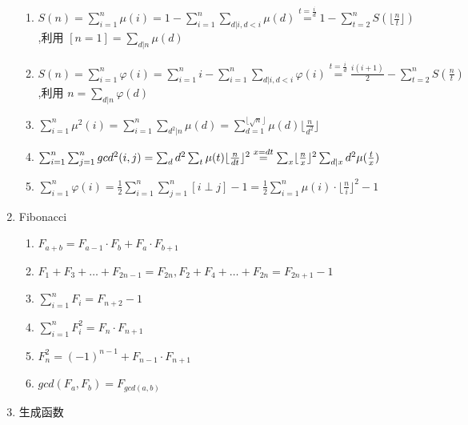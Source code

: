 \documentclass[twoside]{article}
\begin{document}
\begin{enumerate}
\begin{enumerate}
	\item $S(n)=\sum_{i=1}^n \mu(i)=1-\sum_{i=1}^n \sum_{d|i,d < i}\mu(d) \overset{t=\frac id}{=} 1-\sum_{t=2}^nS(\lfloor \frac nt \rfloor)$,利用 $[n=1] = \sum_{d|n} \mu(d)$
	
	\item $S(n)=\sum_{i=1}^n \varphi(i)=\sum_{i=1}^n i-\sum_{i=1}^n \sum_{d|i,d<i} \varphi(i)\overset{t=\frac id}{=} \frac {i(i+1)}{2} - \sum_{t=2}^n S(\frac n t)$,利用 $n = \sum_{d|n} \varphi(d)$
	
	\item $\sum_{i=1}^n \mu^2(i) = \sum_{i=1}^n \sum_{d^2|n} \mu(d)=\sum_{d=1}^{\lfloor \sqrt n \rfloor}\mu(d) \lfloor \frac n {d^2} \rfloor$ 
	
	\item $\sum_{i=1}^n \sum_{j=1}^n gcd^2(i, j)= \sum_{d} d^2 \sum_{t} \mu(t) \lfloor \frac n{dt} \rfloor ^2 \\
	  \overset{x=dt}{=} \sum_{x} \lfloor \frac nx \rfloor ^ 2 \sum_{d|x} d^2 \mu(\frac tx)$
	
	\item $\sum_{i=1}^n \varphi(i)=\frac 12 \sum_{i=1}^n \sum_{j=1}^n [i \perp j] - 1=\frac 12 \sum_{i=1}^n \mu(i) \cdot\lfloor \frac n i \rfloor ^2-1$

\end{enumerate}

\item Fibonacci

\begin{enumerate}
	
	\item $F_{a+b}=F_{a-1} \cdot F_b+F_a \cdot F_{b+1}$
	
	\item $F_1+F_3+\dots +F_{2n-1} = F_{2n},F_2 + F_4 + \dots + F_{2n} = F_{2n + 1} - 1$
	
	\item $\sum_{i=1}^n F_i = F_{n+2} - 1$
	
	\item $\sum_{i=1}^n F_i^2 = F_n \cdot F_{n+1}$
	
	\item $F_n^2=(-1)^{n-1} + F_{n-1} \cdot F_{n+1}$
	
	\item $gcd(F_a, F_b)=F_{gcd(a, b)}$

\end{enumerate}

\item 生成函数

\begin{enumerate}


\end{enumerate}
\end{enumerate}
\end{document}
